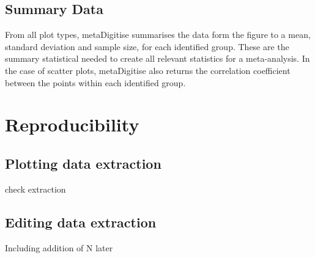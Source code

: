 \documentclass{article}
\begin{document}
\subsection{Summary Data}
From all plot types, metaDigitise summarises the data form the figure to a mean, standard deviation and sample size, for each identified group. These are the summary statistical needed to create all relevant statistics for a meta-analysis. In the case of scatter plots, metaDigitise also returns the correlation coefficient between the points within each identified group. 





\section{Reproducibility}

\subsection{Plotting data extraction}
check extraction

\subsection{Editing data extraction}
Including addition of N later
\end{document}
